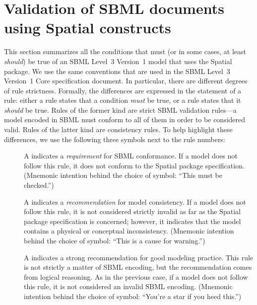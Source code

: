 
\section{Validation of SBML documents using Spatial constructs}
\label{apdx-validation}
\label{validation-rules}

This section summarizes all the conditions that must (or in some cases, at least \emph{should}) be true of an SBML Level~3 Version~1 model that uses the Spatial package.  We use the same conventions that are used in the SBML Level~3 Version~1 Core specification document.  In particular, there are different degrees of rule strictness.  Formally, the differences are expressed in the statement of a rule: either a rule states that a condition \emph{must} be true, or a rule states that it \emph{should} be true.  Rules of the former kind are strict SBML validation rules---a model encoded in SBML must conform to all of them in order to be considered valid.  Rules of the latter kind are consistency rules.  To help highlight these differences, we use the following three symbols next to the rule numbers:

\begin{description}

\item[\hspace*{6.5pt}\vSymbol\vsp] A \vSymbolName indicates a \emph{requirement} for SBML conformance. If a model does not follow this rule, it does not conform to the Spatial package specification.  (Mnemonic intention behind the choice of symbol: ``This must be checked.'')

\item[\hspace*{6.5pt}\cSymbol\csp] A \cSymbolName indicates a \emph{recommendation} for model consistency.  If a model does not follow this rule, it is not considered strictly invalid as far as the Spatial package specification is concerned; however, it indicates that the model contains a physical or conceptual inconsistency.  (Mnemonic intention behind the choice of symbol: ``This is a cause for warning.'')

\item[\hspace*{6.5pt}\mSymbol\msp] A \mSymbolName indicates a strong recommendation for good modeling practice.  This rule is not strictly a matter of SBML encoding, but the recommendation comes from logical reasoning.  As in the previous case, if a model does not follow this rule, it is not considered an invalid SBML encoding.  (Mnemonic intention behind the choice of symbol: ``You're a star if you heed this.'')

\end{description}

